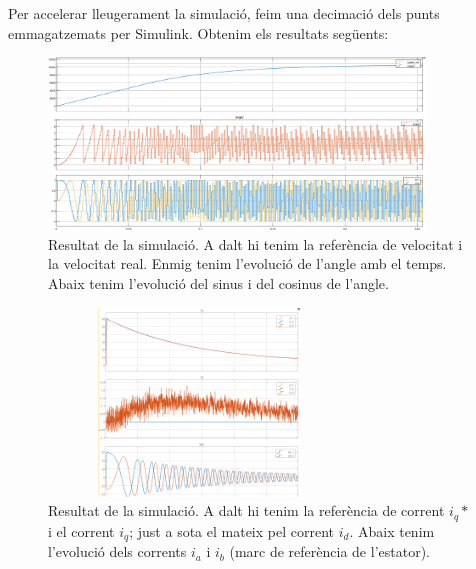 {{        Per accelerar lleugerament la simulació, feim una decimació dels
        punts emmagatzemats per Simulink. Obtenim els resultats següents:
        
        \begin{figure}[!htb]
            \centering
            \captionsetup{justification=centering,margin=1.5cm}
            \includegraphics[width=10cm]
                {img/5_resultats/test.png}
            \caption[Resultat de la simulació (I)]{
                Resultat de la simulació. A dalt hi tenim la referència de
                velocitat i la velocitat real. Enmig tenim l'evolució de l'angle
                amb el temps. Abaix tenim l'evolució del sinus i del cosinus de
                l'angle.
            }
        \end{figure}

        \begin{figure}[!htb]
            \centering
            \captionsetup{justification=centering,margin=1.5cm}
            \includegraphics[width=8cm, height=5cm]
                {img/5_resultats/Untitled.png}
            \caption[Resultat de la simulació (II)]{
                Resultat de la simulació. A dalt hi tenim la referència de
                corrent $i_q*$ i el corrent $i_q$; just a sota el mateix pel
                corrent $i_d$. Abaix tenim l'evolució dels corrents $i_a$ i $i_b$
                (marc de referència de l'estator).
            }
        \end{figure}
    }
}